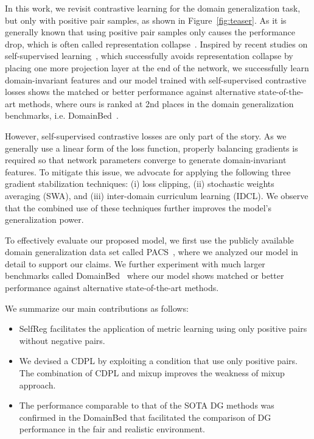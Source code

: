 \documentclass[10pt,twocolumn,letterpaper]{article}
\begin{document}
In this work, we revisit contrastive learning for the domain generalization task, but only with positive pair samples, as shown in Figure~\ref{fig:teaser}. As it is generally known that using positive pair samples only causes the performance drop, which is often called representation collapse~\cite{grill2020bootstrap}. Inspired by recent studies on self-supervised learning~\cite{chen2020exploring, grill2020bootstrap}, which successfully avoids representation collapse by placing one more projection layer at the end of the network, we successfully learn domain-invariant features and our model trained with self-supervised contrastive losses shows the matched or better performance against alternative state-of-the-art methods, where ours is ranked at 2nd places in the domain generalization benchmarks, i.e. DomainBed~\cite{gulrajani2020search}. 

However, self-supervised contrastive losses are only part of the story. As we generally use a linear form of the loss function, properly balancing gradients is required so that network parameters converge to generate domain-invariant features. To mitigate this issue, we advocate for applying the following three gradient stabilization techniques: (i) loss clipping, (ii) stochastic weights averaging (SWA), and (iii) inter-domain curriculum learning (IDCL). We observe that the combined use of these techniques further improves the model's generalization power. 

To effectively evaluate our proposed model, we first use the publicly available domain generalization data set called PACS~\cite{Li2017dg}, where we analyzed our model in detail to support our claims. We further experiment with much larger benchmarks called DomainBed~\cite{gulrajani2020search} where our model shows matched or better performance against alternative state-of-the-art methods.

We summarize our main contributions as follows:
\begin{itemize}
    \item SelfReg facilitates the application of metric learning using only positive pairs without negative pairs. \vspace{-0.5em}
    \item We devised a CDPL by exploiting a condition that use only positive pairs. The combination of CDPL and mixup improves the weakness of mixup approach. \vspace{-0.5em}
    \item The performance comparable to that of the SOTA DG methods was confirmed in the DomainBed that facilitated the comparison of DG performance in the fair and realistic environment. \vspace{-0.5em}
\end{itemize}
\end{document}
